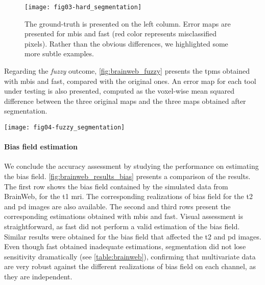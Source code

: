 \begin{figure}
	\centering
	\texttt{[image: fig03-hard\_segmentation]}
	\caption[Visual assessment of the hard-segmentation results]{The ground-truth is presented on the left column.
	Error maps are presented for \gls*{mbis} and \gls*{fast} (red color represents misclassified pixels).
	Rather than the obvious differences, we highlighted some more subtle examples.
    \label{fig:brainweb_hard}}
\end{figure}
Regarding the \emph{fuzzy} outcome, \autoref{fig:brainweb_fuzzy} presents
  the \glspl*{tpm} obtained with \gls*{mbis} and \gls*{fast}, compared with
  the original ones.
An error map for each tool under testing is also presented, computed as the
  voxel-wise mean squared difference between the three original maps and
  the three maps obtained after segmentation.
\begin{figure*}[!htbp]
	\centering
	\texttt{[image: fig04-fuzzy\_segmentation]}
	\caption[Visual assessment of the fuzzy-segmentation results]
	{First row shows the \glspl*{tpm} of the ground-truth (from left to right:
	\gls*{csf}, \gls*{gm}, \gls*{wm}). Second and third rows present the corresponding
	\glspl*{tpm} obtained with \gls*{mbis} and \gls*{fast}, respectively.
	The extra column represents the mean squared error of the \glspl*{tpm}, 
	normalized by the maximum squared error of both maps.}
	\label{fig:brainweb_fuzzy}
\end{figure*}
 

\paragraph{Bias field estimation}
We conclude the accuracy assessment by studying the performance on estimating
  the bias field.
\autoref{fig:brainweb_results_bias} presents a comparison of the results.
The first row shows the bias field contained by the simulated data from BrainWeb,
  for the \gls*{t1} \gls*{mri}.
The corresponding realizations of bias field for the \gls*{t2} and \gls*{pd}
  images are also available.
The second and third rows present the corresponding estimations obtained with 
  \gls*{mbis} and \gls*{fast}.
Visual assessment is straightforward, as \gls*{fast} did not perform a valid
  estimation of the bias field.
Similar results were obtained for the bias field that affected the \gls*{t2} 
  and \gls*{pd} images.
Even though \gls*{fast} obtained inadequate estimations, segmentation did not
  lose sensitivity dramatically (see \autoref{table:brainweb}), confirming
  that multivariate data are very robust against the different realizations of
  bias field on each channel, as they are independent.

